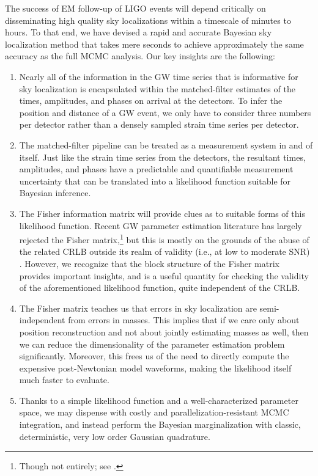 \documentclass[amsmath,amssymb,aps,prx,reprint,nopreprintnumbers,nofootinbib,showpacs]{revtex4-1}
\begin{document}
The success of \ac{EM} follow\nobreakdashes-up of \ac{LIGO} events will depend critically on disseminating high quality sky localizations within a timescale of minutes to hours. To that end, we have devised a rapid and accurate Bayesian sky localization method that takes mere seconds to achieve approximately the same accuracy as the full \ac{MCMC} analysis. Our key insights are the following:
%
\begin{enumerate}
    \item Nearly all of the information in the \ac{GW} time series that is informative for sky localization is encapsulated within the matched\nobreakdashes-filter estimates of the times, amplitudes, and phases on arrival at the detectors. To infer the position and distance of a \ac{GW} event, we only have to consider three numbers per detector rather than a densely sampled strain time series per detector.
    \item The matched\nobreakdashes-filter pipeline can be treated as a measurement system in and of itself. Just like the strain time series from the detectors, the resultant times, amplitudes, and phases have a predictable and quantifiable measurement uncertainty that can be translated into a likelihood function suitable for Bayesian inference.
    \item The Fisher information matrix will provide clues as to suitable forms of this likelihood function. Recent \ac{GW} parameter estimation literature has largely rejected the Fisher matrix,\footnote{Though not entirely; see \cite{EffectiveFisherMatrix}.} but this is mostly on the grounds of the abuse of the related \ac{CRLB} outside its realm of validity (i.e., at low to moderate \ac{SNR}) \cite{BayesianBounds,UseAbuseFisherMatrix,FisherMatrixAsymptoticExpansions,InadequaciesFisherMatrix}. However, we recognize that the block structure of the Fisher matrix provides important insights, and is a useful quantity for checking the validity of the aforementioned likelihood function, quite independent of the \ac{CRLB}.
    \item The Fisher matrix teaches us that errors in sky localization are semi\nobreakdashes-independent from errors in masses. This implies that if we care only about position reconstruction and not about jointly estimating masses as well, then we can reduce the dimensionality of the parameter estimation problem significantly. Moreover, this frees us of the need to directly compute the expensive post-Newtonian model waveforms, making the likelihood itself much faster to evaluate.
    \item Thanks to a simple likelihood function and a well\nobreakdashes-characterized parameter space, we may dispense with costly and parallelization\nobreakdashes-resistant \ac{MCMC} integration, and instead perform the Bayesian marginalization with classic, deterministic, very low order Gaussian quadrature.

\end{enumerate}
\end{document}
